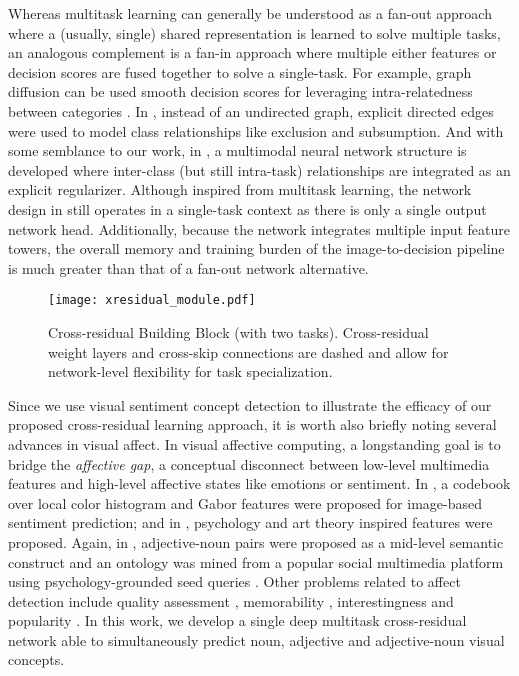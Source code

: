 \documentclass{sig-alternate-05-2015}
\begin{document}
Whereas multitask learning can generally be understood as a fan-out approach where a (usually, single) shared representation is learned to solve multiple tasks, an analogous complement is a fan-in approach where multiple either features or decision scores are fused together to solve a single-task.
For example, graph diffusion can be used smooth decision scores for leveraging intra-relatedness between categories \cite{jiang_2009}.
In \cite{deng_2014}, instead of an undirected graph, explicit directed edges were used to model class relationships like exclusion and subsumption.
And with some semblance to our work, in \cite{wu_2014}, a multimodal neural network structure is developed where inter-class (but still intra-task) relationships are integrated as an explicit regularizer.
Although inspired from multitask learning, the network design in \cite{wu_2014} still operates in a single-task context as there is only a single output network head.
Additionally, because the network integrates multiple input feature towers, the overall memory and training burden of the image-to-decision pipeline is much greater than that of a fan-out network alternative.

\begin{figure}[t]
  \centering
  \texttt{[image: xresidual\_module.pdf]}
  \caption{Cross-residual Building Block (with two tasks). Cross-residual weight layers and cross-skip connections are dashed and allow for network-level flexibility for task specialization.}
  \label{fig:xresidual}
\end{figure}

Since we use visual sentiment concept detection to illustrate the efficacy of our proposed cross-residual learning approach, it is worth also briefly noting several advances in visual affect.
In visual affective computing, a longstanding goal is to bridge the \emph{affective gap}, a conceptual disconnect between low-level multimedia features and high-level affective states like emotions or sentiment.
In \cite{yanulevskaya_2008}, a codebook over local color histogram and Gabor features were proposed for image-based sentiment prediction; and in \cite{machajdik_2010}, psychology and art theory inspired features were proposed.
Again, in \cite{borth_2013}, adjective-noun pairs were proposed as a mid-level semantic construct and an ontology was mined from a popular social multimedia platform using psychology-grounded seed queries \cite{plutchik_1980}.
Other problems related to affect detection include quality assessment \cite{ke_2006}, memorability \cite{isola_2011}, interestingness \cite{gygli_2013} and popularity \cite{khosla_2014}.
In this work, we develop a single deep multitask cross-residual network able to simultaneously predict noun, adjective and adjective-noun visual concepts.
\end{document}
